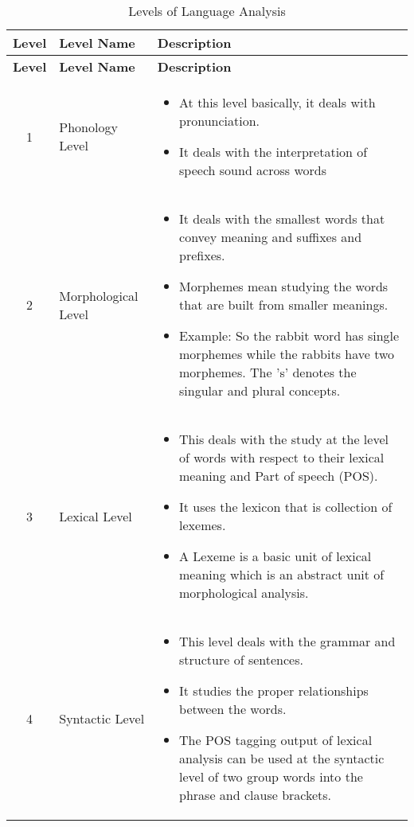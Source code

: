 \begin{longtable}{|c|m{2.7cm}|m{10cm}|}
    \caption{Levels of Language Analysis} \\ \hline

    \textbf{Level} & \textbf{Level Name} & \textbf{Description} \\ \hline
    \endfirsthead
    
    \hline
    \textbf{Level} & \textbf{Level Name} & \textbf{Description} \\ \hline
    \endhead
    \hline \endfoot
    \hline \endlastfoot

    1 & Phonology Level & \begin{itemize}
        \item At this level basically, it deals with pronunciation.
        \item It deals with the interpretation of speech sound across words
    \end{itemize} \\ \hline

    2 & Morphological Level & \begin{itemize}
        \item It deals with the smallest words that convey meaning and suffixes and prefixes.
        \item Morphemes mean studying the words that are built from smaller meanings.
        \item Example: So the rabbit word has single morphemes while the rabbits have two morphemes. The 's' denotes the singular and plural concepts.
    \end{itemize} \\ \hline

    3 & Lexical Level & \begin{itemize}
        \item This deals with the study at the level of words with respect to their lexical meaning and Part of speech (POS).
        \item It uses the lexicon that is collection of lexemes.
        \item A Lexeme is a basic unit of lexical meaning which is an abstract unit of morphological analysis.
    \end{itemize} \\ \hline

    4 & Syntactic Level & \begin{itemize}
        \item This level deals with the grammar and structure of sentences.
        \item It studies the proper relationships between the words.
        \item The POS tagging output of lexical analysis can be used at the syntactic level of two group words into the phrase and clause brackets.
    \end{itemize} \\ \hline


\end{longtable}
